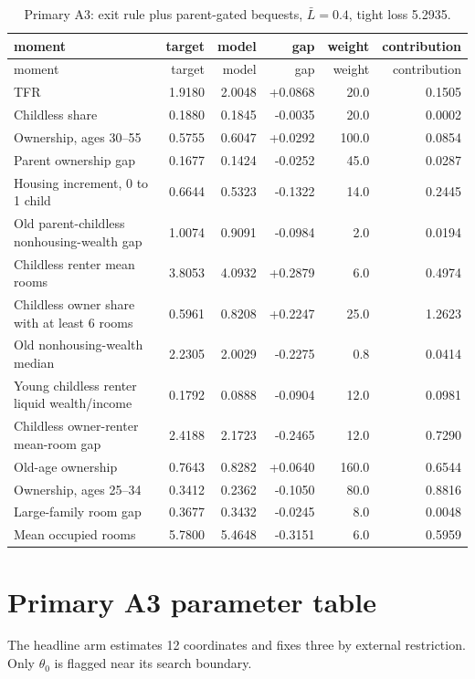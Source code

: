 \documentclass[10pt]{article}
\begin{document}
\begin{longtable}{p{}rrrrr}
\caption{Primary A3: exit rule plus parent-gated bequests, $\bar L=0.4$,
tight loss 5.2935.}
\label{tab:a3fit}\\
\toprule
moment & target & model & gap & weight & contribution \\
\midrule
\endfirsthead
\toprule
moment & target & model & gap & weight & contribution \\
\midrule
\endhead
TFR & 1.9180 & 2.0048 & +0.0868 & 20.0 & 0.1505 \\
Childless share & 0.1880 & 0.1845 & -0.0035 & 20.0 & 0.0002 \\
Ownership, ages 30--55 & 0.5755 & 0.6047 & +0.0292 & 100.0 & 0.0854 \\
Parent ownership gap & 0.1677 & 0.1424 & -0.0252 & 45.0 & 0.0287 \\
Housing increment, 0 to 1 child & 0.6644 & 0.5323 & -0.1322 & 14.0 & 0.2445 \\
Old parent-childless nonhousing-wealth gap & 1.0074 & 0.9091 & -0.0984 & 2.0 & 0.0194 \\
Childless renter mean rooms & 3.8053 & 4.0932 & +0.2879 & 6.0 & 0.4974 \\
Childless owner share with at least 6 rooms & 0.5961 & 0.8208 & +0.2247 & 25.0 & 1.2623 \\
Old nonhousing-wealth median & 2.2305 & 2.0029 & -0.2275 & 0.8 & 0.0414 \\
Young childless renter liquid wealth/income & 0.1792 & 0.0888 & -0.0904 & 12.0 & 0.0981 \\
Childless owner-renter mean-room gap & 2.4188 & 2.1723 & -0.2465 & 12.0 & 0.7290 \\
Old-age ownership & 0.7643 & 0.8282 & +0.0640 & 160.0 & 0.6544 \\
Ownership, ages 25--34 & 0.3412 & 0.2362 & -0.1050 & 80.0 & 0.8816 \\
Large-family room gap & 0.3677 & 0.3432 & -0.0245 & 8.0 & 0.0048 \\
Mean occupied rooms & 5.7800 & 5.4648 & -0.3151 & 6.0 & 0.5959 \\
\bottomrule
\end{longtable}

\section{Primary A3 parameter table}

The headline arm estimates 12 coordinates and fixes three by external
restriction. Only $\theta_0$ is flagged near its search boundary.
\end{document}
